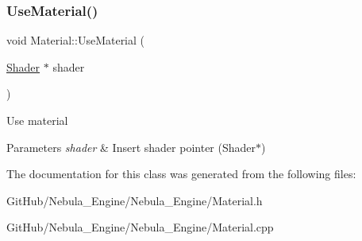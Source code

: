 \subsubsection{\texorpdfstring{UseMaterial()}{UseMaterial()}\hspace{0.1cm}{\footnotesize\ttfamily [2/2]}}
{\footnotesize\ttfamily void Material\+::\+Use\+Material (\begin{DoxyParamCaption}\item[{\mbox{\hyperlink{class_shader}{Shader}} $\ast$}]{shader }\end{DoxyParamCaption})}

Use material 
\begin{DoxyParams}{Parameters}
{\em shader} & Insert shader pointer (Shader$\ast$) \\
\hline
\end{DoxyParams}


The documentation for this class was generated from the following files\+:\begin{DoxyCompactItemize}
\item 
Git\+Hub/\+Nebula\+\_\+\+Engine/\+Nebula\+\_\+\+Engine/Material.\+h\item 
Git\+Hub/\+Nebula\+\_\+\+Engine/\+Nebula\+\_\+\+Engine/Material.\+cpp\end{DoxyCompactItemize}
